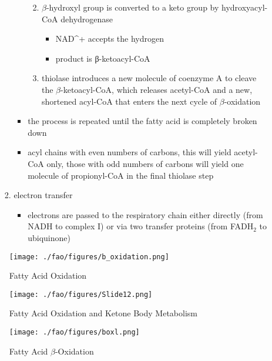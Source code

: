 \documentclass{scrartcl}
\begin{document}
\begin{enumerate}
\begin{itemize}
\begin{enumerate}
\begin{itemize}
\begin{enumerate}
\begin{itemize}
\end{itemize}
\item \(\beta\)-hydroxyl group is converted to a keto group by
hydroxyacyl-CoA dehydrogenase
\begin{itemize}
\item NAD\^{}+ accepts the hydrogen
\item product is β-ketoacyl-CoA
\end{itemize}
\item thiolase introduces a new molecule of coenzyme A to cleave
the \(\beta\)-ketoacyl-CoA, which releases acetyl-CoA and a new,
shortened acyl-CoA that enters the next cycle of
\(\beta\)-oxidation
\end{enumerate}
\item the process is repeated until the fatty acid is completely
broken down
\item acyl chains with even numbers of carbons, this will yield
acetyl-CoA only, those with odd numbers of carbons will yield
one molecule of propionyl-CoA in the final thiolase step
\end{itemize}
\item electron transfer
\begin{itemize}
\item electrons are passed to the respiratory chain either directly
(from NADH to complex I) or via two transfer proteins (from
FADH\(_{\text{2}}\) to ubiquinone)
\end{itemize}
\end{enumerate}
\end{itemize}

\begin{figure}[htbp]
\centering
\texttt{[image: ./fao/figures/b\_oxidation.png]}
\caption{\label{fig:orgf6fc9af}
Fatty Acid Oxidation}
\end{figure}

\begin{figure}[htbp]
\centering
\texttt{[image: ./fao/figures/Slide12.png]}
\caption{\label{fig:org444f64e}
Fatty Acid Oxidation and Ketone Body Metabolism}
\end{figure}


\begin{figure}[htbp]
\centering
\texttt{[image: ./fao/figures/boxl.png]}
\caption{\label{fig:orgbdcb8b7}
Fatty Acid \(\beta\)-Oxidation}
\end{figure}





\end{enumerate}
\end{document}
